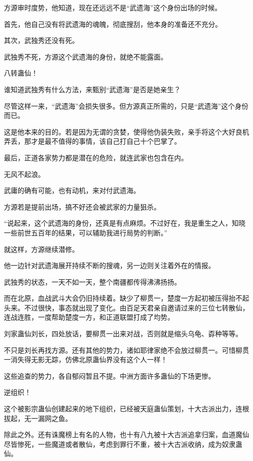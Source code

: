 
\begin{this_body}

方源审时度势，他知道，现在还远远不是“武遗海”这个身份出场的时候。

首先，他自己没有将武遗海的魂魄，彻底搜刮，他本身的准备还不充分。

其次，武独秀还没有死。

武独秀不死，方源这个武遗海的身份，就绝不能露面。

八转蛊仙！

谁知道武独秀有什么方法，来甄别“武遗海”是否是她亲生？

尽管这样一来，“武遗海”会损失很多。但方源真正所需的，只是“武遗海”这个身份而已。

这是他本来的目的。若是因为无谓的贪婪，使得他伪装失败，亲手将这个大好良机弄丢，那才是最不值得的事情，该自己打自己十个巴掌了。

最后，正道各家势力都是潜在的危险，就连武家也包含在内。

无风不起浪。

武庸的确有可能，也有动机，来对付武遗海。

方源若是提前出场，搞不好还会被武家的力量狙杀。

“说起来，这个武遗海的身份，还真是有点麻烦。不过好在，我是重生之人，知晓一些前世五百年的结果，可以辅助我进行局势的判断。”

就这样，方源继续潜修。

他一边针对武遗海展开持续不断的搜魂，另一边则关注着外在的情报。

武独秀的状态，一天不如一天，整个南疆都传得沸沸扬扬。

而在北原，血战武斗大会仍旧持续着。缺少了柳贯一，楚度一方起初被压得抬不起头来。不过很快，事态就出现了变化。由百足天君亲自邀请过来的三位七转散仙，连战连胜，一度帮助楚度一方，和正道联盟打成了均势。

刘家蛊仙刘长，四处放话，要柳贯一出来对战，否则就是缩头乌龟、孬种等等。

不只是刘长再找方源。还有其他的势力，诸如耶律家绝不会放过柳贯一。可惜柳贯一消失得无影无踪，仿佛北原蛊仙界没有这个人一样！

这些追查的势力，各自郁闷暂且不提。中洲方面许多蛊仙的下场更惨。

逆组织！

这个被影宗蛊仙创建起来的地下组织，已经被天庭蛊仙策划，十大古派出力，连根拔起，无一漏网之鱼。

除此之外。还有诛魔榜上有名的人物，也十有八九被十大古派追拿归案，血道魔仙尽皆惨死，一些魔道或者散仙，考虑到罪行不重，被十大古派收纳，成为奴隶蛊仙。


\end{this_body}
